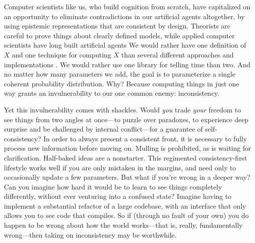 
Computer scientists like us, who build cognition from scratch, have capitalized on an opportunity to eliminate contradictions in our artificial agents altogether, by using epistemic representations that are consistent by design.
Theorists are careful to prove things about clearly defined models,
while applied computer scientists have long built artificial agents
%
%
We would rather have one definition of $X$ and one technique for computing $X$ than several different approaches and implementations
    . 
We would rather use one library for telling time than two.
And no matter how many parameters we add, the goal is to parameterize a single coherent probability distribution. 
Why? Because computing things in just one way grants an invulnerability to our one common enemy: inconsistency.

Yet this invulnerability comes with shackles.
Would \emph{you} trade \emph{your} freedom to see things from two angles at once---to puzzle over paradoxes, to experience deep surprise and be challenged by internal conflict---for a guarantee of self-consistency?
%
In order to always present a consistent front, it is necessary to fully process new information before moving on. Mulling is prohibited, as
is waiting for clarification.
Half-baked ideas are a nonstarter.
This regimented consistency-first lifestyle works well if you are only mistaken in the margins, and need only to occasionally update a few parameters.
But what if you're wrong in a deeper way?
Can you imagine how hard it would be to learn to see things completely differently, without ever venturing into a confused state?
Imagine having to implement a substantial refactor of a large codebase, with an interface that only allows you to see code that compiles.
So if (through no fault of your own) you do happen to be wrong about how the world works---that is, really, fundamentally wrong---then taking on inconsistency may be worthwhile.

